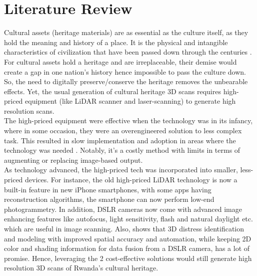 \documentclass[a4paper, 12pt]{article}
\begin{document}
\section{\textbf{Literature Review}}
Cultural assets (heritage materials) are as essential as the culture itself, as they hold the meaning and history of a place.
It is the physical and intangible characteristics of civilization that have been passed down through the centuries \cite{WILLIS2014145}. For cultural assets hold a heritage
and are irreplaceable, their demise would create a gap in one nation's history hence impossible to pass the culture down.
So, the need to digitally preserve/conserve the heritage removes the unbearable effects. Yet, the usual generation of cultural heritage 3D scans requires high-priced equipment (like LiDAR scanner and laser-scanning) \cite{priced} to generate high resolution scans.\\


The high-priced equipment were effective when the technology was in its infancy, where in some occasion, they were an overengineered solution to less complex task. This resulted in slow implementation and adoption in areas where the technology was needed \cite{ptn}. Notably, it's a costly method with limits in terms of augmenting or replacing image-based output. \\

As technology advanced, the high-priced tech was incorporated into smaller, less-priced devices. For instance, the old high-priced LiDAR technology is now a built-in feature in new iPhone smartphones, with some apps having reconstruction algorithms, the smartphone can now perform low-end photogrammetry. In addition, DSLR cameras now come with advanced image enhancing features like autofocus, light sensitivity, flash and natural daylight etc. which are useful in image scanning. Also, \cite{ptn} shows that 3D distress identification and modeling with improved spatial accuracy and automation, while keeping 2D color and shading information for data fusion from a DSLR camera, has a lot of promise. Hence, leveraging the 2 cost-effective solutions would still generate high resolution 3D scans of Rwanda's cultural heritage.
\end{document}
